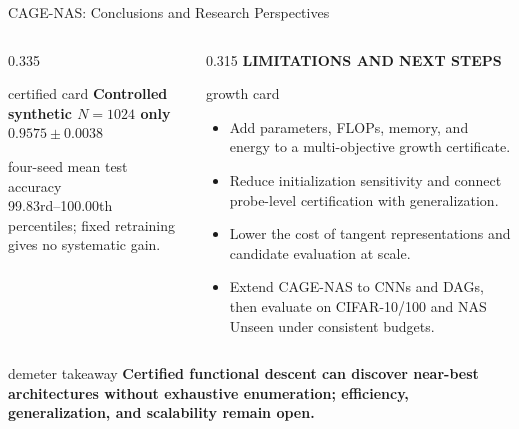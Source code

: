 \begin{frame}[t]{CAGE-NAS: Conclusions and Research Perspectives}
\begin{columns}[T,onlytextwidth]
\begin{column}{0.335\textwidth}
\begin{beamercolorbox}[rounded=true,sep=0.11cm,wd=\linewidth]{certified card}
        \vspace{0.05cm}
        \centering
        {\fontsize{6.35}{7.6}\selectfont\bfseries
        Controlled synthetic $N=1024$ only}\\[0.04cm]
        {\color{CertifiedGreen}\fontsize{10.5}{12.5}\selectfont\bfseries
        $0.9575\pm0.0038$}

        {\fontsize{6.25}{7.5}\selectfont four-seed mean test accuracy}\\[0.06cm]
        {\fontsize{6.55}{7.8}\selectfont
        99.83rd--100.00th percentiles; fixed retraining gives no systematic gain.}
      \end{beamercolorbox}
    \end{column}

    \begin{column}{0.315\textwidth}
      {\color{EnstaBlue}\bfseries\scriptsize LIMITATIONS AND NEXT STEPS}
      \vspace{0.04cm}

      \begin{beamercolorbox}[rounded=true,sep=0.11cm,wd=\linewidth]{growth card}
        {\fontsize{6.8}{8.1}\selectfont
        \begin{itemize}
          \setlength{\itemsep}{0.09cm}
          \item Add parameters, FLOPs, memory, and energy to a multi-objective
                growth certificate.
          \item Reduce initialization sensitivity and connect probe-level
                certification with generalization.
          \item Lower the cost of tangent representations and candidate
                evaluation at scale.
          \item Extend CAGE-NAS to CNNs and DAGs, then evaluate on CIFAR-10/100
                and NAS Unseen under consistent budgets.
        \end{itemize}}
      \end{beamercolorbox}
    \end{column}
  \end{columns}

  \vspace{0.12cm}
  \begin{beamercolorbox}[rounded=true,sep=0.09cm,wd=\linewidth]{demeter takeaway}
    \centering
    {\fontsize{7.0}{8.4}\selectfont\bfseries
    Certified functional descent can discover near-best architectures without
    exhaustive enumeration; efficiency, generalization, and scalability remain open.}
  \end{beamercolorbox}
\end{frame}
